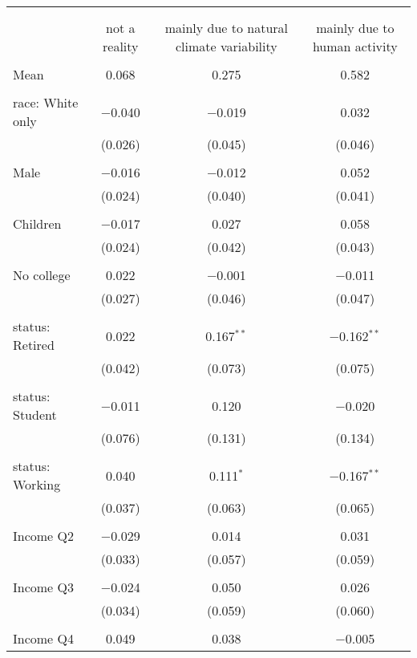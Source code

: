 
\begin{tabular}{@{\extracolsep{5pt}}lccc} 
\\[-1.8ex]\hline 
\hline \\[-1.8ex] 
\\[-1.8ex] & not a reality & mainly due to natural climate variability & mainly due to human activity \\ 
\hline \\[-1.8ex] 
 Mean & 0.068 & 0.275 & 0.582  \\ \hline \\[-1.8ex] race: White only & $-$0.040 & $-$0.019 & 0.032 \\ 
  & (0.026) & (0.045) & (0.046) \\ 
  & & & \\ 
 Male & $-$0.016 & $-$0.012 & 0.052 \\ 
  & (0.024) & (0.040) & (0.041) \\ 
  & & & \\ 
 Children & $-$0.017 & 0.027 & 0.058 \\ 
  & (0.024) & (0.042) & (0.043) \\ 
  & & & \\ 
 No college & 0.022 & $-$0.001 & $-$0.011 \\ 
  & (0.027) & (0.046) & (0.047) \\ 
  & & & \\ 
 status: Retired & 0.022 & 0.167$^{**}$ & $-$0.162$^{**}$ \\ 
  & (0.042) & (0.073) & (0.075) \\ 
  & & & \\ 
 status: Student & $-$0.011 & 0.120 & $-$0.020 \\ 
  & (0.076) & (0.131) & (0.134) \\ 
  & & & \\ 
 status: Working & 0.040 & 0.111$^{*}$ & $-$0.167$^{**}$ \\ 
  & (0.037) & (0.063) & (0.065) \\ 
  & & & \\ 
 Income Q2 & $-$0.029 & 0.014 & 0.031 \\ 
  & (0.033) & (0.057) & (0.059) \\ 
  & & & \\ 
 Income Q3 & $-$0.024 & 0.050 & 0.026 \\ 
  & (0.034) & (0.059) & (0.060) \\ 
  & & & \\ 
 Income Q4 & 0.049 & 0.038 & $-$0.005 \\ 

\end{tabular}
